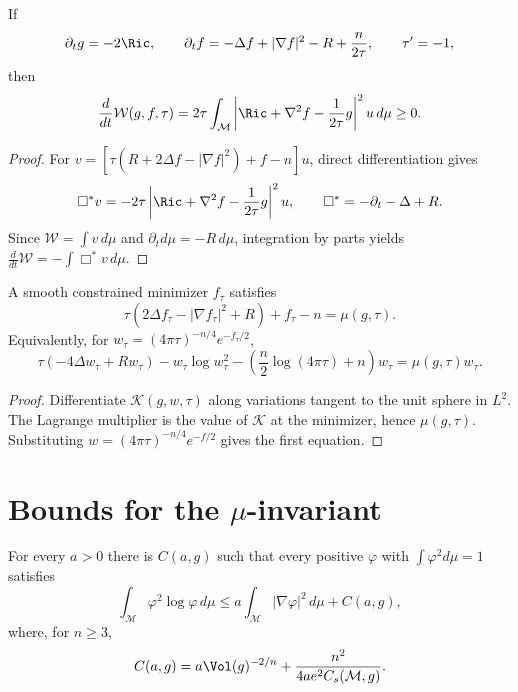 \begin{theorem}
\label{thm:chow-iii-ch17-entropy-monotonicity}
If
\[
 \partial_tg=-2\Ric,\qquad
 \partial_tf=-\Delta f+|\nabla f|^2-R+\frac n{2\tau},
 \qquad \tau'=-1,
\]
then
\[
 \frac d{dt}\mathcal W(g,f,\tau)=2\tau\int_{\mathcal M}
 \left|\Ric+\nabla^2f-\frac1{2\tau}g\right|^2u\,d\mu\ge0.
\]
\end{theorem}
\begin{proof}
\sketch For
$v=[\tau(R+2\Delta f-|\nabla f|^2)+f-n]u$, direct differentiation gives
\[
 \Box^*v=-2\tau\left|\Ric+\nabla^2f-\frac1{2\tau}g\right|^2u,
 \qquad \Box^*=-\partial_t-\Delta+R.
\]
Since $\mathcal W=\int v\,d\mu$ and $\partial_td\mu=-R\,d\mu$,
integration by parts yields $\frac d{dt}\mathcal W=-\int\Box^*v\,d\mu$.
\end{proof}

\begin{lemma}
\label{lem:chow-iii-ch17-entropy-minimizer-equation}
A smooth constrained minimizer $f_\tau$ satisfies
\[
 \tau(2\Delta f_\tau-|\nabla f_\tau|^2+R)+f_\tau-n=\mu(g,\tau).
\]
Equivalently, for $w_\tau=(4\pi\tau)^{-n/4}e^{-f_\tau/2}$,
\[
 \tau(-4\Delta w_\tau+Rw_\tau)-w_\tau\log w_\tau^2
 -\left(\frac n2\log(4\pi\tau)+n\right)w_\tau
 =\mu(g,\tau)w_\tau.
\]
\end{lemma}
\begin{proof}
\sketch Differentiate $\mathcal K(g,w,\tau)$ along variations tangent to the unit
sphere in $L^2$.  The Lagrange multiplier is the value of $\mathcal K$ at
the minimizer, hence $\mu(g,\tau)$.  Substituting
$w=(4\pi\tau)^{-n/4}e^{-f/2}$ gives the first equation.
\end{proof}

\section{Bounds for the \texorpdfstring{$\mu$}{mu}-invariant}

\begin{lemma}
\label{lem:chow-iii-ch17-logarithmic-sobolev}
For every $a>0$ there is $C(a,g)$ such that every positive $\varphi$ with
$\int\varphi^2d\mu=1$ satisfies
\[
 \int_{\mathcal M}\varphi^2\log\varphi\,d\mu
 \le a\int_{\mathcal M}|\nabla\varphi|^2\,d\mu+C(a,g),
\]
where, for $n\ge3$,
\[
 C(a,g)=a\Vol(g)^{-2/n}+\frac{n^2}{4ae^2C_s(\mathcal M,g)}.
\]
\end{lemma}

